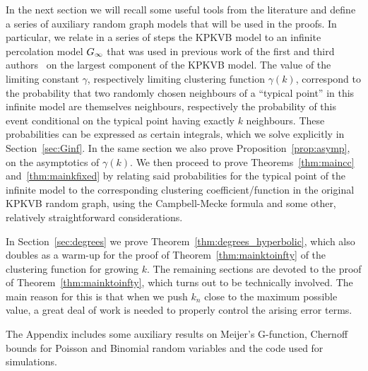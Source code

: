 In the next section we will recall some useful tools from the literature and define a series of auxiliary random graph models 
that will be used in the proofs. In particular, we relate in a series of steps the KPKVB model to an infinite percolation model 
$G_{\infty}$ that was used in previous work of the first and third authors~\cite{fountoulakis2018law} on the largest component 
of the KPKVB model. 
The value of the limiting constant $\gamma$, respectively limiting clustering function $\gamma(k)$, correspond to the probability 
that two randomly chosen neighbours of a ``typical point'' in this infinite model are themselves neighbours, respectively the 
probability of this event conditional on the typical point having exactly $k$ neighbours. These probabilities can be expressed as 
certain integrals, which we solve explicitly in Section~\ref{sec:Ginf}. 
In the same section we also prove Proposition~\ref{prop:asymp}, on the asymptotics of $\gamma(k)$. 
We then proceed to prove Theorems~\ref{thm:maincc} and~\ref{thm:mainkfixed} by relating said probabilities for the typical point 
of the infinite model to the corresponding clustering coefficient/function in the original KPKVB random graph, using the Campbell-Mecke 
formula and some other, relatively straightforward considerations.

In Section~\ref{sec:degrees} we prove Theorem~\ref{thm:degrees_hyperbolic}, which also doubles as a warm-up for the proof 
of Theorem~\ref{thm:mainktoinfty} of the clustering function for growing $k$.
The remaining sections are devoted to the proof of Theorem~\ref{thm:mainktoinfty}, which turns out to be technically involved.
The main reason for this is that when we push $k_n$ close to the maximum possible value, a great deal of work is needed 
to properly control the arising error terms.

The Appendix includes some auxiliary results on Meijer's G-function, Chernoff bounds for Poisson and Binomial 
random variables and the code used for simulations.

